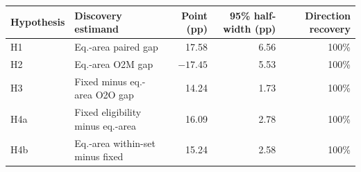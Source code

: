 \begin{tabular}{@{}llrrr@{}}
\toprule
Hypothesis & Discovery estimand & Point (pp) & 95\% half-width (pp) & Direction recovery \\
\midrule
H1  & Eq.-area paired gap & 17.58 & 6.56 & 100\% \\
H2  & Eq.-area O2M gap & $-17.45$ & 5.53 & 100\% \\
H3  & Fixed minus eq.-area O2O gap & 14.24 & 1.73 & 100\% \\
H4a & Fixed eligibility minus eq.-area & 16.09 & 2.78 & 100\% \\
H4b & Eq.-area within-set minus fixed & 15.24 & 2.58 & 100\% \\
\bottomrule
\end{tabular}
